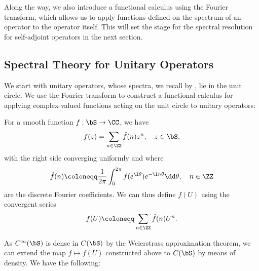 \documentclass[oneside,reqno,letterpaper]{amsart}
\begin{document}
Along the way, we also introduce a functional calculus using the Fourier transform, which allows us to apply functions defined on the spectrum of an operator to the operator itself. 
This will set the stage for the spectral resolution for self-adjoint operators in the next section. 

\subsection{Spectral Theory for Unitary Operators}
We start with unitary operators, whose spectra, we recall by , lie in the unit circle.
We use the Fourier transform to construct a functional calculus for applying complex-valued functions acting on the unit circle to unitary operators:

For a smooth function \(f: \bS \to \CC\), we have
\[
  f(z) = \sum_{n \in \ZZ} \hat{f}(n) z^n, \quad z \in \bS, 
\] 
with the right side converging uniformly and where 
\[
  \hat{f}(n) \coloneqq \frac{1}{2\pi} \int_{0}^{2\pi} f(e^{\I \theta}) e^{-\I n \theta} \dd\theta, \quad  n \in \ZZ 
\] 
are the discrete Fourier coefficients.
We can thus define \(f(U)\) using the convergent series 
\[
  f(U) \coloneqq \sum_{n \in \ZZ} \hat{f}(n) U^n . 
\] 

As \(C^{\infty}(\bS)\) is dense in \(C(\bS)\) by the Weierstrass approximation theorem, we can extend the map \(f \mapsto f(U)\) constructed above to \(C(\bS)\) by means of density.
We have the following:
\end{document}
